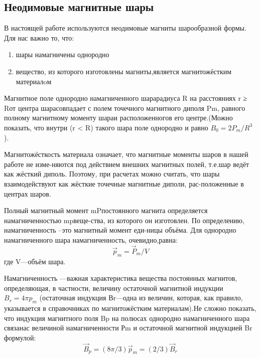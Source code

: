 \documentclass[a4paper, 12pt]{article}
\begin{document}
\subsection{Неодимовые магнитные шары}
В настоящей работе используются неодимовые магниты шарообразной формы. Для нас важно то, что:
\begin{enumerate}
\item шары намагничены однородно
\item вещество, из которого изготовлены магниты,является магнитожёстким материалoм
\end{enumerate}
Магнитное поле однородно намагниченного шарарадиуса R на расстояниях r ≥ Rот центра шарасовпадает с полем точечного магнитного диполя Pm, равного полному магнитному моменту шараи расположенногов его центре.(Можно показать, что внутри (r < R) такого шара поле однородно и равно $B_{0}=2 P_{m} / R^{3}$).

Магнитожёсткость материала означает, что магнитные моменты шаров в нашей работе не изме-няются под действием внешних магнитных полей, т.е.шар ведёт как жёсткий диполь. Поэтому, при расчетах можно считать, что шары взаимодействуют как жёсткие точечные магнитные диполи, рас-положенные в центрах шаров.

Полный магнитный момент mPпостоянного магнита определяется намагниченностью mpвеще-ства, из которого он изготовлен. По определению, намагниченность –это магнитный момент еди-ницы объёма. Для однородно намагниченного шара намагниченность, очевидно,равна:
\begin{equation}\vec{p}_{m}=\vec{P}_{m} / V\end{equation}
где V—объём шара.

Намагниченность —важная характеристика вещества постоянных магнитов, определяющая, в частности, величину остаточной магнитной индукции $B_{r}=4 \pi p_{m}$ (остаточная индукция Вr—одна из величин, которая, как правило, указывается в справочниках по магнитожёстким материалам).Не сложно показать, что индукция магнитного поля Bp на полюсах однородно намагниченного шара связанас величиной намагниченности Рm  и остаточной магнитной индукцией Br формулой:
\begin{equation}\vec{B}_{p}=(8 \pi / 3) \vec{p}_{m}=(2 / 3) \vec{B}_{r}\end{equation}

\end{document}
